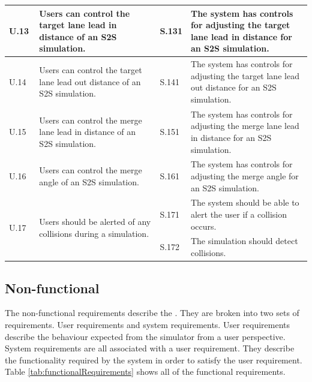 \begin{longtable}{|p{0.1\linewidth}|p{0.4\linewidth}|p{0.1\linewidth}|p{0.4\linewidth}|}
\hline
U.13 & Users can control the target lane lead in distance of an S2S simulation. & S.131 & The system has controls for adjusting the target lane lead in distance for an S2S simulation. \\ 
\hline
U.14 & Users can control the target lane lead out distance of an S2S simulation. & S.141 & The system has controls for adjusting the target lane lead out distance for an S2S simulation. \\ 
\hline
U.15 & Users can control the merge lane lead in distance of an S2S simulation. & S.151 & The system has controls for adjusting the merge lane lead in distance for an S2S simulation. \\ 
\hline
U.16 & Users can control the merge angle of an S2S simulation. & S.161 & The system has controls for adjusting the merge angle for an S2S simulation. \\ 
\hline
\multirow{2}{*}{U.17} & \multirow{2}{*}{\parbox{\linewidth}{Users should be alerted of any collisions during a simulation.}}
 & S.171 & The system should be able to alert the user if a collision occurs. \\
 &  & S.172 & The simulation should detect collisions. \\ 
\hline
\end{longtable}

\subsection{Non-functional}
\label{subsec:Non-functional}
The non-functional requirements describe the . They are broken into two sets of requirements. User requirements and system requirements. User requirements describe the behaviour expected from the simulator from a user perspective. System requirements are all associated with a user requirement. They describe the functionality required by the system in order to satisfy the user requirement. Table \ref{tab:functionalRequirements} shows all of the functional requirements.